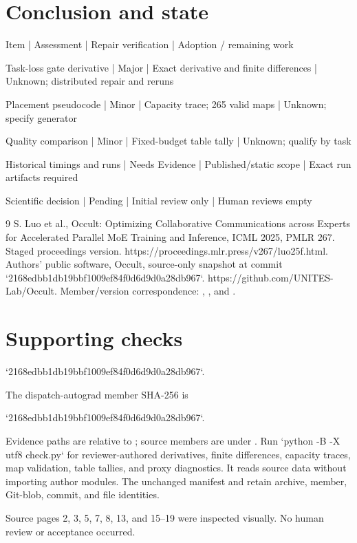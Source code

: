 \documentclass[10pt]{article}
\begin{document}
\section*{Conclusion and state}
Item | Assessment | Repair verification | Adoption / remaining work\par
Task-loss gate derivative | Major | Exact derivative and finite differences | Unknown; distributed repair and reruns\par
Placement pseudocode | Minor | Capacity trace; 265 valid maps | Unknown; specify generator\par
Quality comparison | Minor | Fixed-budget table tally | Unknown; qualify by task\par
Historical timings and runs | Needs Evidence | Published/static scope | Exact run artifacts required\par
Scientific decision | Pending | Initial review only | Human reviews empty\par
9 S. Luo et al., Occult: Optimizing Collaborative Communications across Experts for Accelerated Parallel MoE Training and Inference, ICML 2025, PMLR 267. Staged proceedings version. https://proceedings.mlr.press/v267/luo25f.html. Authors’ public software, Occult, source-only snapshot at commit `2168edbb1db19bbf1009ef84f0d6d9d0a28db967`. https://github.com/UNITES-Lab/Occult. Member/version correspondence: , , and .\par
\section*{Supporting checks}
`2168edbb1db19bbf1009ef84f0d6d9d0a28db967`.\par
The dispatch-autograd member SHA-256 is\par
`2168edbb1db19bbf1009ef84f0d6d9d0a28db967`.\par
Evidence paths are relative to ; source members are under . Run `python -B -X utf8 check.py` for reviewer-authored derivatives, finite differences, capacity traces, map validation, table tallies, and proxy diagnostics. It reads source data without importing author modules. The unchanged manifest and retain archive, member, Git-blob, commit, and file identities.\par
Source pages 2, 3, 5, 7, 8, 13, and 15–19 were inspected visually. No human review or acceptance occurred.\par
\end{document}
